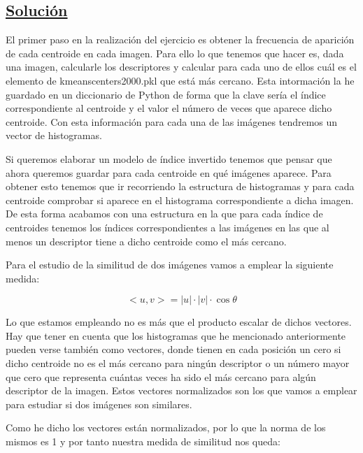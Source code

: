 \documentclass[12pt,a4paper]{article}
\begin{document}
\subsection*{\underline{Solución}}

El primer paso en la realización del ejercicio es obtener la frecuencia de aparición de cada centroide en cada imagen. Para ello lo que tenemos que hacer es, dada una imagen, calcularle los descriptores y calcular para cada uno de ellos cuál es el elemento de kmeanscenters2000.pkl que está más cercano. Esta intormación la he guardado en un diccionario de Python de forma que la clave sería el índice correspondiente al centroide y el valor el número de veces que aparece dicho centroide. Con esta información para cada una de las imágenes tendremos un vector de histogramas.

\vspace{10px}

Si queremos elaborar un modelo de índice invertido tenemos que pensar que ahora queremos guardar para cada centroide en qué imágenes aparece. Para obtener esto tenemos que ir recorriendo la estructura de histogramas y para cada centroide comprobar si aparece en el histograma correspondiente a dicha imagen. De esta forma acabamos con una estructura en la que para cada índice de centroides tenemos los índices correspondientes a las imágenes en las que al menos un descriptor tiene a dicho centroide como el más cercano.

\vspace{10px}

Para el estudio de la similitud de dos imágenes vamos a emplear la siguiente medida:

$$<u,v> = |u|\cdot |v|\cdot \cos{\theta}$$

Lo que estamos empleando no es más que el producto escalar de dichos vectores. Hay que tener en cuenta que los histogramas que he mencionado anteriormente pueden verse también como vectores, donde tienen en cada posición un cero si dicho centroide no es el más cercano para ningún descriptor o un número mayor que cero que representa cuántas veces ha sido el más cercano para algún descriptor de la imagen. Estos vectores normalizados son los que vamos a emplear para estudiar si dos imágenes son similares.

\vspace{10px}

Como he dicho los vectores están normalizados, por lo que la norma de los mismos es 1 y por tanto nuestra medida de similitud nos queda:
\end{document}
